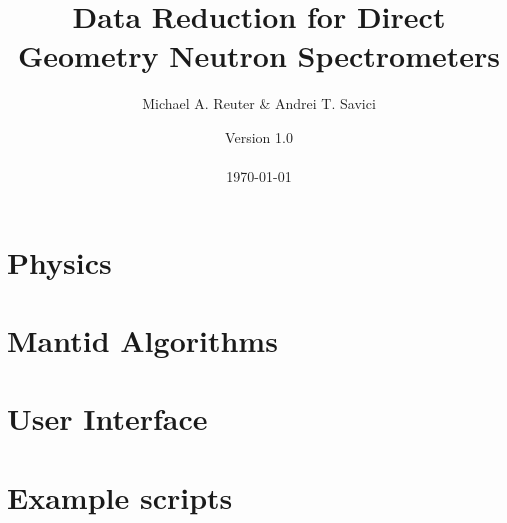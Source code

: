 \documentclass[11pt]{article}
\numberwithin{equation}{section}
\numberwithin{figure}{section}
\begin{document}
\title{Data Reduction for Direct Geometry Neutron Spectrometers}
\author{Michael A. Reuter \& Andrei T. Savici}
\date{Version 1.0 \\ \ \\ \today}
\maketitle

\section{Physics}\label{sec:Physics}

\section{Mantid Algorithms}\label{sec:Algs}

\section{User Interface}\label{sec:UI}

\section{Example scripts}\label{sec:Examples}

\end{document}
